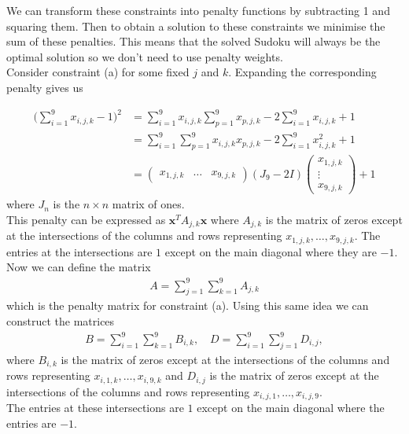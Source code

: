 \documentclass{article}
\begin{document}
\noindent We can transform these constraints into penalty functions by subtracting 1 and squaring them. Then to obtain a solution to these constraints we minimise the sum of these penalties. This means that the solved Sudoku will always be the optimal solution so we don't need to use penalty weights.\\

\noindent Consider constraint (a) for some fixed \(j\) and \(k\). Expanding the corresponding penalty gives us

\begin{align*}
    \bigg(\sum_{i=1}^9 x_{i,j,k} - 1\bigg)^2 &= \sum_{i=1}^9 x_{i,j,k}\sum_{p=1}^9 x_{p,j,k} -2\sum_{i=1}^9 x_{i,j,k} + 1  \\
    &= \sum_{i=1}^9\sum_{p=1}^9 x_{i,j,k}x_{p,j,k} -2\sum_{i=1}^9 x_{i,j,k}^2 + 1 \\
    &= \begin{pmatrix}
        x_{1,j,k} & \dots & x_{9,j,k}
    \end{pmatrix} (J_{9} - 2I) \begin{pmatrix}
        x_{1,j,k} \\
        \vdots \\
        x_{9,j,k}
    \end{pmatrix} + 1
\end{align*}
where \(J_{n}\) is the \(n \times n\) matrix of ones. \\

\noindent This penalty can be expressed as \(\mathbf{x}^T A_{j,k} \mathbf{x}\) where \(A_{j,k}\) is the matrix of zeros except at the intersections of the columns and rows representing \(x_{1,j,k}, \dots, x_{9,j,k}\). The entries at the intersections are \(1\) except on the main diagonal where they are \(-1\).\\

\noindent Now we can define the matrix 
\begin{align*}
    A = \sum_{j=1}^9\sum_{k=1}^9 A_{j,k}
\end{align*}
which is the penalty matrix for constraint (a). Using this same idea we can construct the matrices 
\begin{align*}
    B = \sum_{i=1}^9\sum_{k=1}^9 B_{i,k}, \quad D = \sum_{i=1}^9\sum_{j=1}^9 D_{i,j},
\end{align*}
where \(B_{i,k}\) is the matrix of zeros except at the intersections of the columns and rows representing \(x_{i,1,k}, \dots, x_{i,9,k}\) and \(D_{i,j}\) is the matrix of zeros except at the intersections of the columns and rows representing \(x_{i,j,1}, \dots, x_{i,j,9}\).\\
The entries at these intersections are \(1\) except on the main diagonal where the entries are \(-1\).\\
\end{document}

